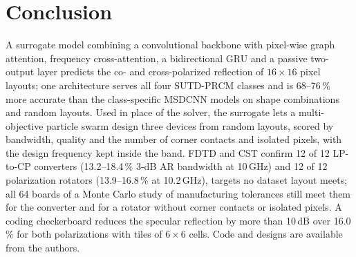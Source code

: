 \documentclass[journal]{IEEEtran}
\begin{document}
\section{Conclusion}
A surrogate model combining a convolutional backbone with pixel-wise graph attention, frequency cross-attention, a bidirectional GRU and a passive two-output layer predicts the co- and cross-polarized reflection of $16\times16$ pixel layouts; one architecture serves all four SUTD-PRCM classes and is 68--76\,\% more accurate than the class-specific MSDCNN models on shape combinations and random layouts. Used in place of the solver, the surrogate lets a multi-objective particle swarm design three devices from random layouts, scored by bandwidth, quality and the number of corner contacts and isolated pixels, with the design frequency kept inside the band. FDTD and CST confirm 12 of 12 LP-to-CP converters (13.2--18.4\,\% 3-dB AR bandwidth at 10\,GHz) and 12 of 12 polarization rotators (13.9--16.8\,\% at 10.2\,GHz), targets no dataset layout meets; all 64 boards of a Monte Carlo study of manufacturing tolerances still meet them for the converter and for a rotator without corner contacts or isolated pixels. A coding checkerboard reduces the specular reflection by more than 10\,dB over 16.0\,\% for both polarizations with tiles of $6\times6$ cells. Code and designs are available from the authors.
\end{document}
